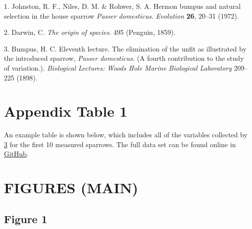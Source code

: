 \documentclass[
]{article}
\newenvironment{cslreferences}%
  {}%
  {\par}
\begin{document}
\hypertarget{refs}{}
\begin{cslreferences}
\leavevmode\hypertarget{ref-Johnston1972}{}%
1. Johnston, R. F., Niles, D. M. \& Rohwer, S. A. Hermon bumpus and natural selection in the house sparrow \emph{Passer domesticus}. \emph{Evolution} \textbf{26}, 20--31 (1972).

\leavevmode\hypertarget{ref-Darwin1859}{}%
2. Darwin, C. \emph{The origin of species}. 495 (Penguin, 1859).

\leavevmode\hypertarget{ref-Bumpus1898}{}%
3. Bumpus, H. C. Eleventh lecture. The elimination of the unfit as illustrated by the introduced sparrow, \emph{Passer domesticus}. (A fourth contribution to the study of variation.). \emph{Biological Lectures: Woods Hole Marine Biological Laboratory} 209--225 (1898).
\end{cslreferences}

\clearpage

\hypertarget{appendix-table-1}{%
\section{Appendix Table 1}\label{appendix-table-1}}

An example table is shown below, which includes all of the variables collected by \protect\hyperlink{ref-Bumpus1898}{3} for the first 10 measured sparrows. The full data set can be found online in \href{https://github.com/StirlingCodingClub/Manuscripts_in_Rmarkdown/blob/master/data/Bumpus_data.csv}{GitHub}.

\clearpage

\hypertarget{figures-main}{%
\section{FIGURES (MAIN)}\label{figures-main}}

\hypertarget{figure-1}{%
\subsection{Figure 1}\label{figure-1}}
\end{document}
